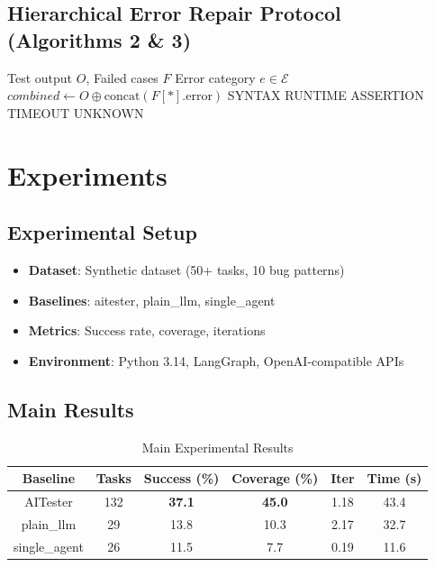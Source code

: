 \documentclass[10pt, conference]{ieeeconf}
\begin{document}
\subsection{Hierarchical Error Repair Protocol (Algorithms 2 \& 3)}

\begin{algorithm}[h]
\caption{Error Classification (Rule Matching)}
\begin{algorithmic}[1]
\REQUIRE Test output $O$, Failed cases $F$
\ENSURE Error category $e \in \mathcal{E}$
\STATE $combined \leftarrow O \oplus \text{concat}(F[*].\text{error})$
 \RETURN SYNTAX
\ENDIF
{} \RETURN RUNTIME
\ENDIF
{} \RETURN ASSERTION
\ENDIF
{} \RETURN TIMEOUT
\ENDIF
\RETURN UNKNOWN
\end{algorithmic}
\end{algorithm}

\section{Experiments}

\subsection{Experimental Setup}
\begin{itemize}
    \item \textbf{Dataset}: Synthetic dataset (50+ tasks, 10 bug patterns)
    \item \textbf{Baselines}: aitester, plain\_llm, single\_agent
    \item \textbf{Metrics}: Success rate, coverage, iterations
    \item \textbf{Environment}: Python 3.14, LangGraph, OpenAI-compatible APIs
\end{itemize}

\subsection{Main Results}

\begin{table}[h]
\centering
\caption{Main Experimental Results}
\begin{tabular}{cccccc}
\hline
\textbf{Baseline} & \textbf{Tasks} & \textbf{Success (\%)} & \textbf{Coverage (\%)} & \textbf{Iter} & \textbf{Time (s)} \\
\hline
AITester & 132 & \textbf{37.1} & \textbf{45.0} & 1.18 & 43.4 \\
plain\_llm & 29 & 13.8 & 10.3 & 2.17 & 32.7 \\
single\_agent & 26 & 11.5 & 7.7 & 0.19 & 11.6 \\
\hline
\end{tabular}
\end{table}
\end{document}
